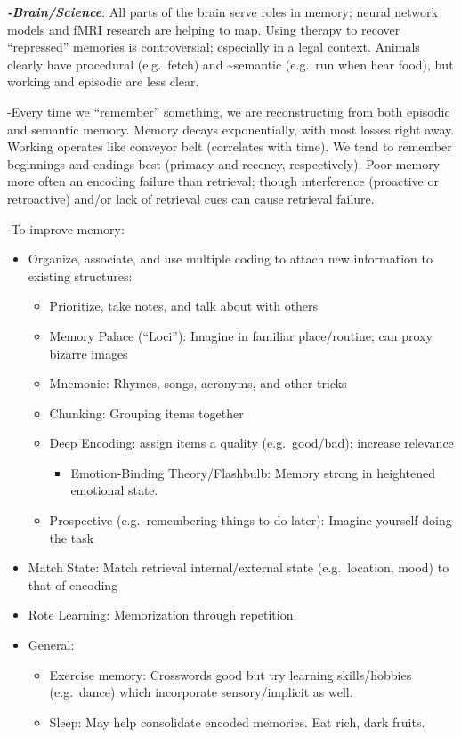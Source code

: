 \documentclass[
]{article}
\providecommand{\tightlist}{%
  \setlength{\itemsep}{0pt}\setlength{\parskip}{0pt}}
\begin{document}
\textbf{\emph{-Brain/Science}}: All parts of the brain serve roles in
memory; neural network models and fMRI research are helping to map.
Using therapy to recover ``repressed'' memories is controversial;
especially in a legal context. Animals clearly have procedural
(e.g.~fetch) and \textasciitilde semantic (e.g.~run when hear food), but
working and episodic are less clear.

-Every time we ``remember'' something, we are reconstructing from both
episodic and semantic memory. Memory decays exponentially, with most
losses right away. Working operates like conveyor belt (correlates with
time). We tend to remember beginnings and endings best (primacy and
recency, respectively). Poor memory more often an encoding failure than
retrieval; though interference (proactive or retroactive) and/or lack of
retrieval cues can cause retrieval failure.

-To improve memory:

\begin{itemize}
\item
  Organize, associate, and use multiple coding to attach new information
  to existing structures:

  \begin{itemize}
  \item
    Prioritize, take notes, and talk about with others
  \item
    Memory Palace (``Loci''): Imagine in familiar place/routine; can
    proxy bizarre images
  \item
    Mnemonic: Rhymes, songs, acronyms, and other tricks
  \item
    Chunking: Grouping items together
  \item
    Deep Encoding: assign items a quality (e.g.~good/bad); increase
    relevance

    \begin{itemize}
    \tightlist
    \item
      Emotion-Binding Theory/Flashbulb: Memory strong in heightened
      emotional state.
    \end{itemize}
  \item
    Prospective (e.g.~remembering things to do later): Imagine yourself
    doing the task
  \end{itemize}
\item
  Match State: Match retrieval internal/external state (e.g.~location,
  mood) to that of encoding
\item
  Rote Learning: Memorization through repetition.
\item
  General:

  \begin{itemize}
  \item
    Exercise memory: Crosswords good but try learning skills/hobbies
    (e.g.~dance) which incorporate sensory/implicit as well.
  \item
    Sleep: May help consolidate encoded memories. Eat rich, dark fruits.
  \end{itemize}
\end{itemize}
\end{document}
